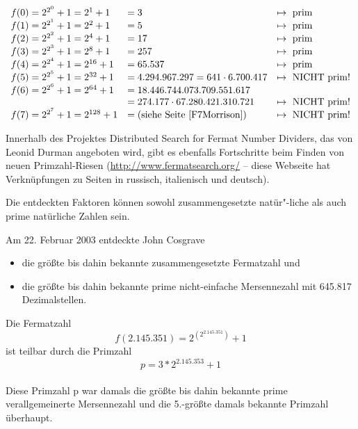 \begin{refsegment}
	
$$
\begin{array}{lll}
f(0) = 2^{2^0} + 1  = 2^1 + 1 & = 3 &   \mapsto {\rm ~prim}  \\
f(1) = 2^{2^1} + 1  = 2^2 + 1 & = 5 &   \mapsto {\rm ~prim}  \\
f(2) = 2^{2^2} + 1  = 2^4 + 1 & = 17 &  \mapsto {\rm ~prim}  \\
f(3) = 2^{2^3} + 1  = 2^8 + 1 & = 257 & \mapsto {\rm ~prim}  \\
f(4) = 2^{2^4} + 1  = 2^{16} + 1 &  = 65.537 &  \mapsto {\rm ~prim}  \\
f(5) = 2^{2^5} + 1  = 2^{32} + 1 &  = 4.294.967.297 = 641 \cdot
6.700.417 &  \mapsto {\rm ~NICHT~prim} !\\
f(6) = 2^{2^6} + 1  = 2^{64} + 1 &  = 18.446.744.073.709.551.617 \\
                                 &  = 274.177 \cdot 67.280.421.310.721
																 & \mapsto {\rm ~NICHT~prim} ! \\
f(7) = 2^{2^7} + 1  = 2^{128} + 1 & = \mbox{(siehe Seite~\pageref{F7Morrison})}
																 & \mapsto {\rm ~NICHT~prim} !
															
\end{array}
$$

    Innerhalb des Projektes \glqq Distributed Search for Fermat Number
    Dividers\grqq, das von Leonid Durman angeboten wird, gibt es ebenfalls
    Fortschritte beim Finden von neuen Primzahl-Riesen
    ({\url{http://www.fermatsearch.org/}}  --  diese Webseite hat
    Verknüpfungen zu Seiten in russisch, italienisch und deutsch).
    \begin{sloppypar}
    Die entdeckten Faktoren können sowohl zusammengesetzte natür"-liche als
    auch prime natürliche Zahlen sein.
    \end{sloppypar}

    Am 22. Februar 2003 entdeckte John Cosgrave
    \begin{itemize}
     \item die größte bis dahin bekannte zusammengesetzte Fermatzahl und
     \item die größte bis dahin bekannte prime nicht-einfache Mersennezahl
           mit 645.817 Dezimalstellen.
    \end{itemize}


    Die Fermatzahl
    $$ f(2.145.351) = 2^{(2^{2.145.351})} + 1 $$
    ist teilbar durch die Primzahl
    $$ p = 3*2^{2.145.353} + 1 $$ \\
    Diese Primzahl p war damals die größte bis dahin bekannte prime
    verallgemeinerte Mersennezahl
    und die 5.-größte damals bekannte Primzahl überhaupt.


\end{refsegment}
